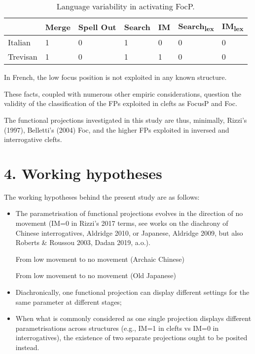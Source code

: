 \documentclass[fleqn,10pt]{wlscirep}
\begin{document}
\begin{table}[ht]
    \centering
    \begin{tabular}{|l|l|l|l|l|l|l|}
    \hline
     & Merge & Spell Out & Search & IM & Search\textsubscript{lex} & IM\textsubscript{lex} \\
    \hline
    Italian & 1 & 0 & 1 & 0 & 0 & 0 \\
    \hline
    Trevisan & 1 & 0 & 1 & 1 & 0 & 0\\
    \hline
    \end{tabular}
    \caption{\label{tab:samp2}Language variability in activating FocP.}
    \end{table}

In French, the low focus position is not exploited in any known structure. 

These facts, coupled with numerous other empiric considerations, question the validity of the classification of the FPs exploited in clefts as FocusP and Foc. 

The functional projections investigated in this study are thus, minimally, Rizzi’s (1997), Belletti’s (2004) Foc, and the higher FPs exploited in inversed and interrogative clefts.

\begin{exe}
    \ex 
\end{exe}

\section*{4. Working hypotheses}
The working hypotheses behind the present study are as follows:

\begin{itemize}
\item The parametrisation of functional projections evolves in the direction of no movement (IM=0 in Rizzi’s 2017 terms, see works on the diachrony of Chinese interrogatives, Aldridge 2010, or Japanese, Aldridge 2009, but also Roberts \& Roussou 2003, Dadan 2019, a.o.).

\begin{exe}
    \ex From low movement to no movement (Archaic Chinese)
\end{exe}
\begin{exe}
    \ex From low movement to no movement (Old Japanese)
\end{exe}

\item Diachronically, one functional projection can display different settings for the same parameter at different stages;

\item When what is commonly considered as one single projection displays different parametrisations across structures (e.g., IM=1 in clefts vs IM=0 in interrogatives), the existence of two separate projections ought to be posited instead.
\end{itemize}
\end{document}
